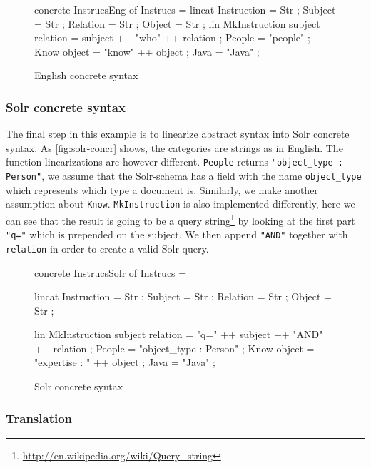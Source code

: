 \newenvironment{myfont}{\myfont}{\par}

\begin{figure}[h]
\begin{code}
concrete InstrucsEng of Instrucs = {
  lincat
    Instruction = Str ;
    Subject = Str ;
    Relation = Str ;
    Object = Str ;
  lin
    MkInstruction subject relation = subject ++ "who" ++ relation ;
    People = "people" ;
    Know object = "know" ++ object ;
    Java = "Java" ;
}
\end{code}
\caption{English concrete syntax\label{fig:english-concr}}
\end{figure}

\subsubsection*{Solr concrete syntax}

The final step in this example is to linearize abstract syntax into Solr concrete syntax.
  As \autoref{fig:solr-concr} shows, the categories are strings as in English. The function linearizations are however
  different. \texttt{People} returns 
  \texttt{"object\_type : Person"}, we assume that 
  the Solr-schema has a field with the name \texttt{object\_type} which represents 
  which type a document is. Similarly, we make another assumption about \texttt{Know}. \texttt{MkInstruction} is also implemented differently, here we can see that the result is going to be a query string\footnote{\url{http://en.wikipedia.org/wiki/Query\_string}} by looking at the first part \texttt{"q="} which is prepended on the subject. We then append \texttt{"AND"} together with \texttt{relation} in order to create a valid Solr query.

\begin{figure}[h]
\begin{code}
concrete InstrucsSolr of Instrucs = {
    lincat
      Instruction = Str ;
      Subject = Str ;
      Relation = Str ;
      Object = Str ;

    lin
      MkInstruction subject relation = "q=" ++ subject ++ "AND" ++ relation ;
      People = "object_type : Person" ;
      Know object = "expertise : " ++ object ;
      Java = "Java" ;
}
\end{code}
\caption{Solr concrete syntax\label{fig:solr-concr}}
\end{figure}

\subsubsection*{Translation}

